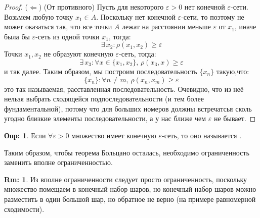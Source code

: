 \documentclass[12pt]{article}
\newcommand{\VE}{\varepsilon}
\theoremstyle{definition}
\newtheorem{defn}{Опр:}
\newtheorem{rem}{Rm:}
\begin{document}
\begin{proof}
	($\Leftarrow$) (От противного) Пусть для некоторого $\VE > 0$ нет конечной $\VE$-сети. Возьмем любую точку $x_1 \in A$. Поскольку нет конечной $\VE$-сети, то поэтому не может оказаться так, что все точки $A$ лежат на расстоянии меньше $\VE$ от $x_1$, иначе была бы $\VE$-сеть из одной точки $x_1$, тогда: 
	$$
		\exists \, x_2 \colon \rho(x_1,x_2) \geq  \VE
	$$
	Точки $x_1, x_2$ не образуют конечную $\VE$-сеть, тогда:
	$$
		\exists \, x_3 \colon \forall x \in \{x_1, x_2\}, \, \rho(x_3, x) \geq \VE
	$$
	и так далее. Таким образом, мы построим последовательность $\{x_n\}$ такую,что:
	$$
		\{x_n\} \colon \forall n \neq m, \, \rho(x_n, x_m) \geq \VE
	$$
	это так называемая, расставленная последовательность. Очевидно, что из неё нельзя выбрать сходящейся подпоследовательности (и тем более фундаментальной), потому что для больших номеров должны встречатсья сколь угодно близкие элементы последовательности, а у нас ближе чем $\VE$ не бывает.
\end{proof}

\begin{defn}
	Если $\forall \VE > 0$ множество имеет конечную $\VE$-сеть, то оно называется .
\end{defn}
Таким образом, чтобы теорема Больцано осталась, необходимо ограниченность заменить вполне ограниченностью.
\begin{rem}
	Из вполне ограниченности следует просто ограниченность, поскольку множество помещаем в конечный набор шаров, но конечный набор шаров  можно разместить в один большой шар, но обратное не верно (на примере равномерной сходимости).
\end{rem}
\end{document}
